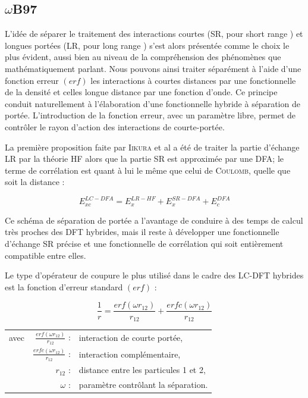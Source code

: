 {{\subsection{$\omega$B97}

L'idée de séparer le traitement des interactions courtes (SR, pour \og short range \fg{}) et longues portées (LR, pour \og long range \fg{}) s'est alors présentée comme le choix le plus évident, aussi bien au niveau de la compréhension des phénomènes que mathématiquement parlant. Nous pouvons ainsi traiter séparément à l'aide d'une fonction erreur $(erf)$ les interactions à courtes distances par une fonctionnelle de la densité et celles longue distance par une fonction d'onde. Ce principe conduit naturellement à l'élaboration d'une fonctionnelle hybride à séparation de portée. L'introduction de la fonction erreur, avec un paramètre libre, permet de contrôler le rayon d'action des interactions de courte-portée.

La première proposition faite par \textsc{Iikura} et al\cite{iikura2001long} a été de traiter la partie d'échange LR par la théorie HF alors que la partie SR est approximée par une DFA; le terme de corrélation est quant à lui le même que celui de \textsc{Coulomb}, quelle que soit la distance :

\begin{equation}
E_{xc}^{LC-DFA} = E_{x}^{LR-HF} + E_{x}^{SR-DFA} + E_{c}^{DFA}
\end{equation}

Ce schéma de séparation de portée a l'avantage de conduire à des temps de calcul très proches des DFT hybrides, mais il reste à développer une fonctionnelle d'échange SR précise et une fonctionnelle de corrélation qui soit entièrement compatible entre elles.

Le type d'opérateur de coupure le plus utilisé dans le cadre des LC-DFT hybrides est la fonction d'erreur standard $(erf)$ :

\begin{equation}
\frac{1}{r} = \frac{erf(\omega r_{12})}{r_{12}} + \frac{erfc(\omega r_{12})}{r_{12}}
\label{erf}
\end{equation}

\begin{flushleft}
\begin{tabular}{@{}lrp{10cm}}
avec & $\frac{erf(\omega r_{12})}{r_{12}}$ : & interaction de courte portée, \\
& $\frac{erfc(\omega r_{12})}{r_{12}}$ : & interaction complémentaire, \\
& $r_{12}$ : & distance entre les particules 1 et 2, \\
& $\omega$ : & paramètre contrôlant la séparation.
\end{tabular}
\end{flushleft}

}}
